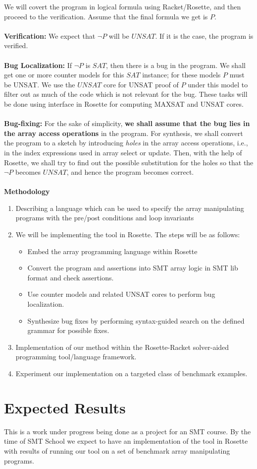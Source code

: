 \documentclass[letterpaper]{article} %
\begin{document}
We will covert the program in logical formula using Racket/Rosette, and then proceed to the verification. Assume that the final formula we get is $P$.\\\\
{\bf Verification:} We expect that $\neg P$ will be $UNSAT$. If it is the case, the program is verified.
\\\\
{\bf Bug Localization:} If $\neg P$ is $SAT$, then there is a bug in the program. We shall get one or more counter models for this $SAT$ instance; for these models $P$ must be UNSAT.  We use the $UNSAT$ core for UNSAT proof of $P$ under this model to filter out as much of the code which is not relevant for the bug. These tasks will be done using interface in Rosette for computing MAXSAT and UNSAT cores. \\
\\
{\bf Bug-fixing:} For the sake of simplicity, {\bf we shall assume that the bug lies in the array access operations} in the program. For synthesis, we shall convert the program to a sketch by introducing \emph{holes} in the array access operations, i.e., in the index expressions used in array select or update. Then, with the help of Rosette, we shall try to find out the possible substitution for the holes so that the $\neg P$ becomes $UNSAT$, and hence the program becomes correct. \\
\\
{\bf Methodology}
\begin{enumerate}
	\item  Describing a language which can be used to specify the array manipulating programs with the pre/post conditions and loop invariants
	\item We will be implementing the tool in Rosette. The steps will be as follows:
	\begin{itemize}
		\item Embed the array programming language within Rosette
		\item Convert the program and assertions into SMT array logic in SMT lib format and check assertions.
		\item Use counter models and related UNSAT cores to perform bug localization.
		\item Synthesize bug fixes by performing syntax-guided search on the defined grammar for possible fixes.
	\end{itemize}
	\item Implementation of our method within the Rosette-Racket solver-aided programming tool/language framework.
	\item Experiment our implementation on a targeted class of benchmark examples.
\end{enumerate}


\section{Expected Results}
This is a work under progress being done as a project for an SMT course.
By the time of SMT School we expect to have an implementation of the tool in Rosette with results of running our tool on a set of benchmark array manipulating programs.



\end{document}
